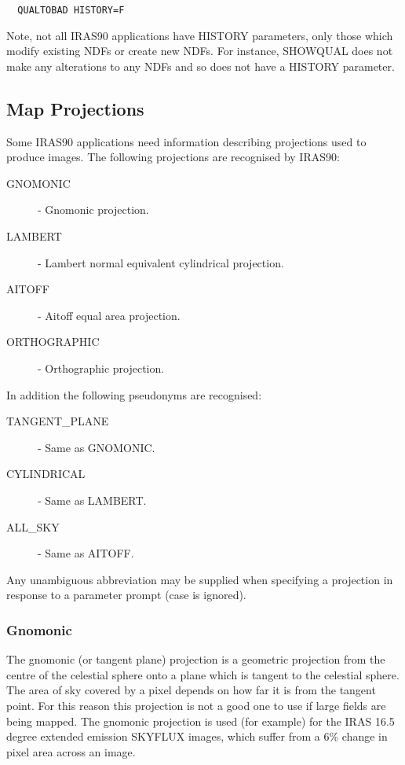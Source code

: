 \small
\begin{verbatim}
  QUALTOBAD HISTORY=F
\end{verbatim}
\normalsize
Note, not all {\small IRAS90} applications have {\small HISTORY}
parameters, only  those which modify existing {\small NDF}s or create
new {\small NDF}s. For  instance, {\small SHOWQUAL} does not make any
alterations to any {\small NDF}s and so does not have a {\small
HISTORY} parameter.

\subsection{Map Projections}
\label{SEC:PROJ}
Some {\small IRAS90} applications need information describing projections
used to produce images. The following projections are recognised
by {\small IRAS90}:
\begin{description}
\item [GNOMONIC]     - Gnomonic projection.
\item [LAMBERT]      - Lambert normal equivalent cylindrical projection.
\item [AITOFF]       - Aitoff equal area projection.
\item [ORTHOGRAPHIC] - Orthographic projection.
\end{description}

In addition the following pseudonyms are recognised:
\begin{description}

\item [TANGENT\_PLANE] - Same as GNOMONIC.
\item [CYLINDRICAL]   - Same as LAMBERT.
\item [ALL\_SKY]       - Same as AITOFF.
\end{description}

Any unambiguous abbreviation may be supplied when specifying a
projection in response to a parameter prompt (case is ignored).

\subsubsection{Gnomonic}
The gnomonic (or tangent plane) projection is a geometric
projection from the centre of the celestial sphere onto a plane
which is tangent to the celestial sphere. The area of sky
covered by a pixel depends on how far it is from the tangent
point. For this reason this projection is not a good one to use
if large fields are being mapped. The gnomonic projection is
used (for example) for the {\small IRAS} 16.5 degree extended emission
{\small SKYFLUX} images, which suffer from a 6\% change in pixel area
across an image.

